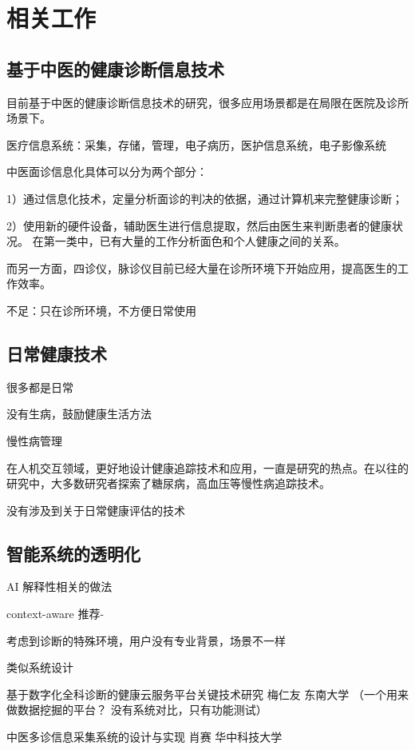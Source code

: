 \chapter{相关工作}

\section{基于中医的健康诊断信息技术}

目前基于中医的健康诊断信息技术的研究，很多应用场景都是在局限在医院及诊所场景下。

医疗信息系统：采集，存储，管理，电子病历，医护信息系统，电子影像系统

中医面诊信息化具体可以分为两个部分：

1）通过信息化技术，定量分析面诊的判决的依据，通过计算机来完整健康诊断；

2）使用新的硬件设备，辅助医生进行信息提取，然后由医生来判断患者的健康状况。
在第一类中，已有大量的工作分析面色和个人健康之间的关系。

而另一方面，四诊仪，脉诊仪目前已经大量在诊所环境下开始应用，提高医生的工作效率。

不足：只在诊所环境，不方便日常使用

\section{日常健康技术}



很多都是日常

没有生病，鼓励健康生活方法

慢性病管理

在人机交互领域，更好地设计健康追踪技术和应用，一直是研究的热点。在以往的研究中，大多数研究者探索了糖尿病，高血压等慢性病追踪技术。




没有涉及到关于日常健康评估的技术

\section{智能系统的透明化}

AI 解释性相关的做法

context-aware
推荐-

考虑到诊断的特殊环境，用户没有专业背景，场景不一样


类似系统设计

基于数字化全科诊断的健康云服务平台关键技术研究 梅仁友 东南大学 （一个用来做数据挖掘的平台？  没有系统对比，只有功能测试）

中医多诊信息采集系统的设计与实现 肖赛 华中科技大学